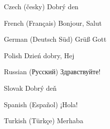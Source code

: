 \documentclass{article}
\begin{document}
Czech (česky)           Dobrý den

French (Français)       Bonjour, Salut

German (Deutsch Süd)    Grüß Gott

Polish                  Dzień dobry, Hej

\selectfont

Russian (Русский)       Здравствуйте!

\selectfont

Slovak                  Dobrý deň

Spanish (Español)       ¡Hola!

Turkish (Türkçe)        Merhaba
\end{document}
